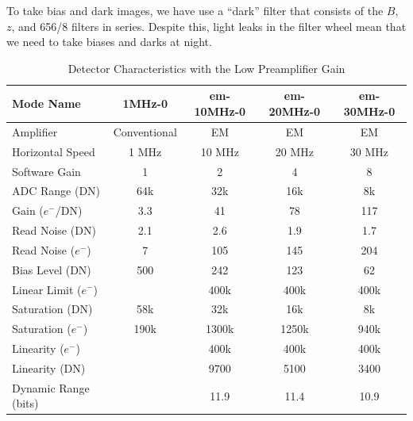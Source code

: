 To take bias and dark images, we have use a “dark” filter that consists of the $B$, $z$, and 656/8 filters in series. Despite this, light leaks in the filter wheel mean that we need to take biases and darks at night.

\begin{table}
    \centering
    \begin{tabular}{lcccc}
    \hline
    Mode Name&1MHz-0&em-10MHz-0&em-20MHz-0&em-30MHz-0\\
    \hline
    Amplifier&Conventional&EM&EM&EM\\
    Horizontal Speed&1 MHz&10 MHz&20 MHz&30 MHz\\
    Software Gain&1&2&4&8\\
    ADC Range (DN)&64k&32k&16k&8k\\
    Gain ($e^-$/DN)&3.3&41&78&117\\
    Read Noise (DN)&2.1&2.6&1.9&1.7\\
    Read Noise ($e^-$)&7&105&145&204\\
    Bias Level (DN)&500&242&123&62\\
    Linear Limit ($e^-$)&&400k&400k&400k\\
    Saturation (DN)&58k&32k&16k&8k\\
    Saturation ($e^-$)&190k&1300k&1250k&940k\\
    Linearity ($e^-$)&&400k&400k&400k\\
    Linearity (DN)&&9700&5100&3400\\
    Dynamic Range (bits)&&11.9&11.4&10.9\\
    \hline
    \end{tabular}
    \caption{Detector Characteristics with the Low Preamplifier Gain}
    \label{table:huitzi-f20-detector-characteristics-low-gain}
\end{table}

